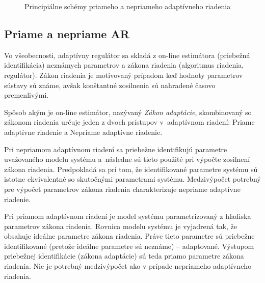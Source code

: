 \documentclass[a4paper, 10pt, ]{article}
\begin{document}
\begin{figure}[!t]
	\centering

	\vspace{-3mm}

	\caption{Principiálne schémy priameho a nepriameho adaptívneho riadenia}
	\label{Principiálne schémy priameho a nepriameho adaptívneho riadenia}
\end{figure}



\subsection{Priame a nepriame AR}

Vo všeobecnosti, adaptívny regulátor sa skladá z on-line estimátora (priebežná identifikácia) neznámych parametrov a zákona riadenia (algoritmus riadenia, regulátor). Zákon riadenia je motivovaný prípadom keď hodnoty parametrov sústavy sú známe, avšak konštantné zosilnenia sú nahradené časovo premenlivými.

Spôsob akým je on-line estimátor, nazývaný \emph{Zákon adaptácie}, skombinovaný so zákonom riadenia určuje jeden z dvoch prístupov v~adaptívnom riadení: Priame adaptívne riadenie a Nepriame adaptívne riadenie.

Pri nepriamom adaptívnom riadení sa priebežne identifikujú parametre uvažovaného modelu systému a~následne sú tieto použité pri výpočte zosilnení zákona riadenia. Predpokladá sa pri tom, že identifikované parametre systému sú istotne ekvivalentné so skutočnými parametrami systému. Medzivýpočet potrebný pre výpočet parametrov zákona riadenia charakterizuje nepriame adaptívne riadenie.

Pri priamom adaptívnom riadení je model systému parametrizovaný z hľadiska parametrov zákona riadenia. Rovnica modelu systému je vyjadrená tak, že obsahuje ideálne parametre zákona riadenia. Práve tieto parametre sú priebežne identifikované (pretože ideálne parametre sú neznáme) -- adaptované. Výstupom priebežnej identifikácie (zákona adaptácie) sú teda priamo parametre zákona riadenia. Nie je potrebný medzivýpočet ako v prípade nepriameho adaptívneho riadenia.



{}

\end{document}
